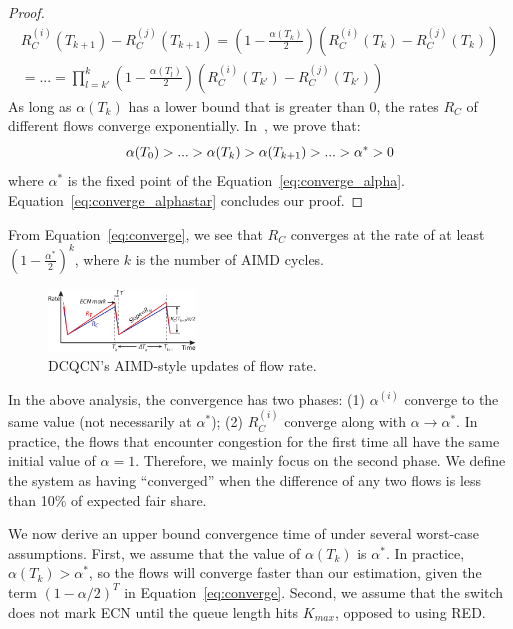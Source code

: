 \begin{proof}
\begin{equation}
\begin{array}{l}
R_C^{(i)}({T_{k + 1}}) - R_C^{(j)}({T_{k + 1}}) = \left( {1 - \frac{{\alpha ({T_k})}}{2}} \right)\left( {R_C^{(i)}({T_k}) - R_C^{(j)}({T_k})} \right)\\
 = ... = \prod\limits_{l = k'}^k {\left( {1 - \frac{{\alpha ({T_l})}}{2}} \right)} \left( {R_C^{(i)}({T_{k'}}) - R_C^{(j)}({T_{k'}})} \right)
\end{array}
\label{eq:converge}
\end{equation}
As long as $\alpha ({T_k})$ has a lower bound that is greater than 0, the rates $R_C$ of different flows 
converge exponentially. In~\cite{fullpaper}, we prove that:
\begin{equation}
\small
\alpha ({T_0}) > ... > \alpha ({T_k}) > \alpha ({T_{k + 1}}) > ... > {\alpha ^*} > 0
\label{eq:converge_alphastar}
\end{equation}
where $\alpha^{*}$ is the fixed point of the Equation~\ref{eq:converge_alpha}.
Equation~\ref{eq:converge_alphastar} concludes our proof. 
\end{proof}
From Equation~\ref{eq:converge}, we see that $R_C$ converges at the rate
of at least $( {1 - \frac{{{\alpha ^{*}}}}{2}} )^k$, where $k$ is the number of
AIMD cycles.

\begin{figure}[t]
\center
\includegraphics[width=0.35\textwidth]{figures/dcqcn_convergence_brief.eps}
\vspace{-1em}
\caption{DCQCN's AIMD-style updates of flow rate.}
\vspace{-1.5em}
\label{fig:dcqcn_convergence}
\end{figure}
\fi

In the above analysis, the convergence has two phases: (1) $\alpha ^{(i)}$
converge to the same value (not necessarily at $\alpha^*$); (2) $R_C^{(i)}$
converge along with $\alpha \to \alpha^*$.  In practice, the flows that
encounter congestion for the first time all have the same initial value of
$\alpha = 1$.  Therefore, we mainly focus on the second phase. We define the
system as having ``converged'' when the difference of any two flows is less than
10\% of expected fair share.

We now derive an upper bound convergence time of under several worst-case
assumptions. First, we assume that the value of $\alpha ({T_k})$ is $\alpha ^*$.
In practice, $\alpha ({T_k}) > \alpha ^*$, so the flows will converge faster
than our estimation, given the term $(1 - \alpha /2)^T$ in
Equation~\ref{eq:converge}.  Second, we assume that the switch does not mark ECN
until the queue length hits $K_{max}$, opposed to using RED. 


